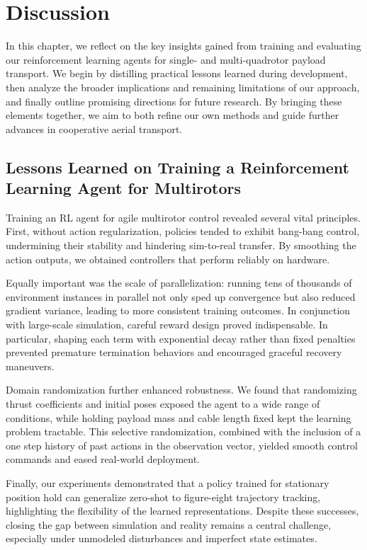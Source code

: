\chapter{Discussion}

In this chapter, we reflect on the key insights gained from training and evaluating our reinforcement learning agents for single- and multi-quadrotor payload transport. We begin by distilling practical lessons learned during development, then analyze the broader implications and remaining limitations of our approach, and finally outline promising directions for future research. By bringing these elements together, we aim to both refine our own methods and guide further advances in cooperative aerial transport.

\section{Lessons Learned on Training a Reinforcement Learning Agent for Multirotors}

Training an RL agent for agile multirotor control revealed several vital principles.  First, without action regularization, policies tended to exhibit bang-bang control, undermining their stability and hindering sim-to-real transfer.  By smoothing the action outputs, we obtained controllers that perform reliably on hardware.

Equally important was the scale of parallelization: running tens of thousands of environment instances in parallel not only sped up convergence but also reduced gradient variance, leading to more consistent training outcomes.  In conjunction with large-scale simulation, careful reward design proved indispensable.  In particular, shaping each term with exponential decay rather than fixed penalties prevented premature termination behaviors and encouraged graceful recovery maneuvers.

Domain randomization further enhanced robustness.  We found that randomizing thrust coefficients and initial poses exposed the agent to a wide range of conditions, while holding payload mass and cable length fixed kept the learning problem tractable.  This selective randomization, combined with the inclusion of a one step history of past actions in the observation vector, yielded smooth control commands and eased real-world deployment.

Finally, our experiments demonstrated that a policy trained for stationary position hold can generalize zero-shot to figure-eight trajectory tracking, highlighting the flexibility of the learned representations.  Despite these successes, closing the gap between simulation and reality remains a central challenge, especially under unmodeled disturbances and imperfect state estimates.

